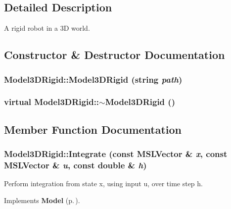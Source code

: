 \subsection{Detailed Description}
A rigid robot in a 3D world.



\subsection{Constructor \& Destructor Documentation}
\subsubsection{\setlength{\rightskip}{0pt plus 5cm}Model3DRigid::Model3DRigid (string {\em path})}\label{classModel3DRigid_a0}


\subsubsection{\setlength{\rightskip}{0pt plus 5cm}virtual Model3DRigid::$\sim$Model3DRigid ()\hspace{0.3cm}{\tt  [inline, virtual]}}\label{classModel3DRigid_a1}




\subsection{Member Function Documentation}
\subsubsection{ Model3DRigid::Integrate (const {\bf MSLVector} \& {\em x}, const {\bf MSLVector} \& {\em u}, const double \& {\em h})\hspace{0.3cm}{\tt  [virtual]}}\label{classModel3DRigid_a2}


Perform integration from state x, using input u, over time step h.



Implements {\bf Model} {\rm (p.\,\pageref{classModel_a5})}.

